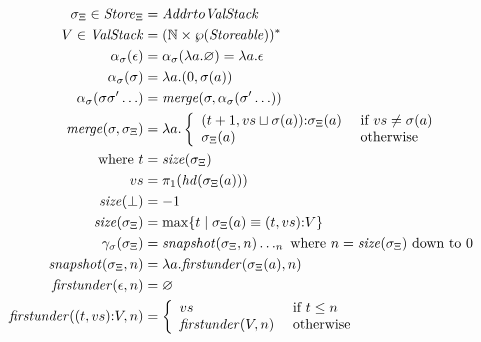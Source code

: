 \documentclass{llncs}
\begin{document}
\newcommand{\fnmerge}{\mathit{merge}}
\newcommand{\last}{\mathit{last}}
\newcommand{\snapshot}{\mathit{snapshot}}
\newcommand{\firstunder}{\mathit{firstunder}}
\newcommand{\size}{\mathit{size}}
\begin{align*}
\msto_{\Xi} \in \Store_{\Xi} &= \Addr to \Valstack \\
\mvalstack \in \Valstack &= (\Timestamp \times \wp(\Storeable))^* \\
\alpha_\msto(\epsilon) &= \alpha_\msto(\lambda\maddr.\varnothing) = \lambda\maddr. \epsilon \\
\alpha_\msto(\msto) &= \lambda\maddr. \ttuple{0}{\msto(\maddr)} \\
\alpha_\msto(\msto\msto'\ldots) &= \fnmerge(\msto,\alpha_\msto(\msto'\ldots)) \\
\fnmerge(\msto,\msto_{\Xi}) &=
  \lambda\maddr.
    \left\{
      \begin{array}{ll}
        \cons{\ttuple{t+1}{\mval{s} \sqcup \msto(\maddr)}}{\msto_{\Xi}(\maddr)} & \text{ if } \mval{s} \neq \msto(\maddr) \\
        \msto_{\Xi}(\maddr) & \text{ otherwise}
      \end{array}
    \right.
\\
\text{ where } t &= \size(\msto_{\Xi}) \\
\mval{s} &= \pi_1(\hd(\msto_{\Xi}(\maddr))) \\              
\size(\bot) &= -1 \\
\size(\msto_{\Xi}) &= \max\setof{t \mid \msto_{\Xi}(\maddr) \equiv \cons{\ttuple{t}{\mval{s}}}{\mvalstack}} \\
\gamma_\msto(\msto_{\Xi}) &= \snapshot(\msto_{\Xi},n)\ldots_n \text{ where } n = \size(\msto_{\Xi}) \text{ down to } 0 \\
\snapshot(\msto_{\Xi},n) &= \lambda \maddr. \firstunder(\msto_{\Xi}(\maddr),n) \\
\firstunder(\epsilon,n) &= \varnothing \\
\firstunder(\cons{\ttuple{t}{\mval{s}}}{\mvalstack},n) &= 
  \left\{\begin{array}{ll}\mval{s} & \text{ if }t \le n \\
                          \firstunder(\mvalstack,n) & \text{ otherwise}
         \end{array}\right.
\end{align*}
\end{document}
